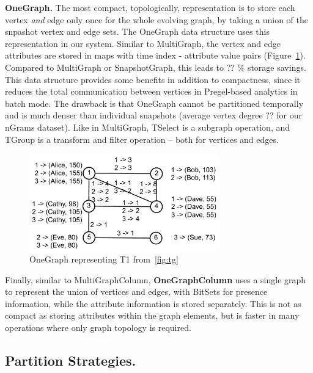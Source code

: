 {\bf OneGraph.}  The most compact, topologically, representation is to
store each vertex {\em and} edge only once for the whole evolving
graph, by taking a union of the snpashot vertex and edge sets.  The
OneGraph data structure uses this representation in our system.
Similar to MultiGraph, the vertex and edge attributes are stored in
maps with time index - attribute value pairs (Figure~\ref{fig:og}).
Compared to MultiGraph or SnapshotGraph, this leads to ?? \% storage
savings.  This data structure provides some benefits in addition to
compactness, since it reduces the total communication between vertices
in Pregel-based analytics in batch mode.  The drawback is that
OneGraph cannot be partitioned temporally and is much denser than
individual snapshots (average vertex degree ??  for our nGrams
dataset).  Like in MultiGraph, TSelect is a subgraph operation, and
TGroup is a transform and filter operation -- both for vertices and
edges.

\begin{figure}[t!]
\includegraphics[width=3.2in]{figs/og.pdf}
\caption{OneGraph representing T1 from~\ref{fig:tg}}
\label{fig:og}
\end{figure}

Finally, similar to MultiGraphColumn, {\bf OneGraphColumn} uses a single
graph to represent the union of vertices and edges, with BitSets for
presence information, while the attribute information is stored
separately.  This is not as compact as storing attributes within the
graph elements, but is faster in many operations where only graph
topology is required.

\subsection{Partition Strategies.}  

